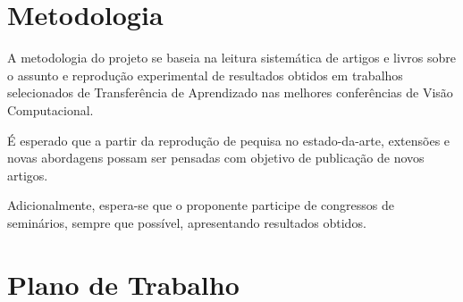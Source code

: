 \documentclass[
12pt, %
a4paper, %
onecolumn, %
]{article}
\begin{document}

\section{Metodologia}

A metodologia do projeto se baseia na leitura sistemática de artigos e livros sobre o assunto e reprodução experimental de resultados obtidos em trabalhos selecionados de Transferência de Aprendizado nas melhores conferências de Visão Computacional. 

É esperado que a partir da reprodução de pequisa no estado-da-arte, extensões e novas abordagens possam ser pensadas com objetivo de publicação de novos artigos.

Adicionalmente, espera-se que o proponente participe de congressos de seminários, sempre que possível, apresentando resultados obtidos.


\section{Plano de Trabalho}
\end{document}
